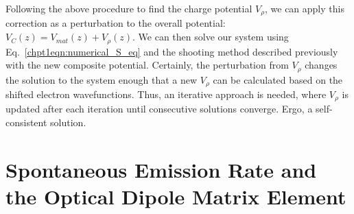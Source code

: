 \documentclass[12pt]{report}
\begin{document}
{Following the above procedure to find the charge potential $V_\rho$, we can apply this correction as a perturbation to the overall potential: $V_C(z)=V_{mat}(z)+V_\rho(z)$.  We can then solve our system using Eq.~\eqref{chpt1eqn:numerical_S_eq} and the shooting method described previously with the new composite potential.  Certainly, the perturbation from $V_\rho$ changes the solution to the system enough that a new $V_\rho$ can be calculated based on the shifted electron wavefunctions.  Thus, an iterative approach is needed, where $V_\rho$ is updated after each iteration until consecutive solutions converge.  Ergo, a self-consistent solution.



\section{Spontaneous Emission Rate and the Optical Dipole Matrix Element}

}
\end{document}
